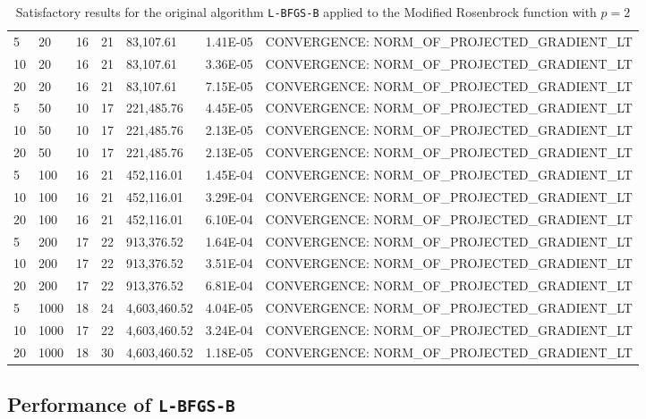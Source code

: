 \begin{center}
\begin{table}
\begin{tabular}{|l|l|l|l|l|p{1.2cm}|p{8.1cm}|}
      5 & 20 & 16 & 21 & 83,107.61 & 1.41E-05 & CONVERGENCE: NORM\_OF\_PROJECTED\_GRADIENT\_LT \\
      10 & 20 & 16 & 21 & 83,107.61 & 3.36E-05 & CONVERGENCE: NORM\_OF\_PROJECTED\_GRADIENT\_LT \\
      20 & 20 & 16 & 21 & 83,107.61 & 7.15E-05 & CONVERGENCE: NORM\_OF\_PROJECTED\_GRADIENT\_LT \\
      5 & 50 & 10 & 17 & 221,485.76 & 4.45E-05 & CONVERGENCE: NORM\_OF\_PROJECTED\_GRADIENT\_LT \\
      10 & 50 & 10 & 17 & 221,485.76 & 2.13E-05 & CONVERGENCE: NORM\_OF\_PROJECTED\_GRADIENT\_LT \\
      20 & 50 & 10 & 17 & 221,485.76 & 2.13E-05 & CONVERGENCE: NORM\_OF\_PROJECTED\_GRADIENT\_LT \\
      5 & 100 & 16 & 21 & 452,116.01 & 1.45E-04 & CONVERGENCE: NORM\_OF\_PROJECTED\_GRADIENT\_LT \\
      10 & 100 & 16 & 21 & 452,116.01 & 3.29E-04 & CONVERGENCE: NORM\_OF\_PROJECTED\_GRADIENT\_LT \\
      20 & 100 & 16 & 21 & 452,116.01 & 6.10E-04 & CONVERGENCE: NORM\_OF\_PROJECTED\_GRADIENT\_LT \\
      5 & 200 & 17 & 22 & 913,376.52 & 1.64E-04 & CONVERGENCE: NORM\_OF\_PROJECTED\_GRADIENT\_LT \\
      10 & 200 & 17 & 22 & 913,376.52 & 3.51E-04 & CONVERGENCE: NORM\_OF\_PROJECTED\_GRADIENT\_LT \\
      20 & 200 & 17 & 22 & 913,376.52 & 6.81E-04 & CONVERGENCE: NORM\_OF\_PROJECTED\_GRADIENT\_LT \\
      5 & 1000 & 18 & 24 & 4,603,460.52 & 4.04E-05 & CONVERGENCE: NORM\_OF\_PROJECTED\_GRADIENT\_LT \\
      10 & 1000 & 17 & 22 & 4,603,460.52 & 3.24E-04 & CONVERGENCE: NORM\_OF\_PROJECTED\_GRADIENT\_LT \\
      20 & 1000 & 18 & 30 & 4,603,460.52 & 1.18E-05 & CONVERGENCE: NORM\_OF\_PROJECTED\_GRADIENT\_LT \\
      \hline
    \end{tabular}
    \caption[Modified Rosenbrock with $p = 2$]{Satisfactory results for the original algorithm \texttt{L-BFGS-B} applied to the Modified Rosenbrock function with $p = 2$}
    \label{pequal2}
  \end{table}
\end{center}

\subsection{Performance of \texttt{L-BFGS-B}}

